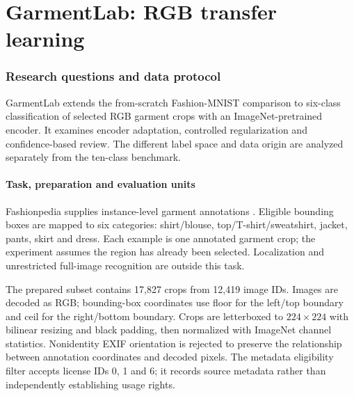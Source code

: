 \clearpage
\part{GarmentLab: RGB transfer learning}
\section{Research questions and data protocol}\label{sec:garmentlab}
GarmentLab extends the from-scratch Fashion-MNIST comparison to six-class classification of selected RGB garment crops with an ImageNet-pretrained encoder. It examines encoder adaptation, controlled regularization and confidence-based review. The different label space and data origin are analyzed separately from the ten-class benchmark.

\subsection{Task, preparation and evaluation units}
Fashionpedia supplies instance-level garment annotations \cite{fashionpedia}. Eligible bounding boxes are mapped to six categories: shirt/blouse, top/T-shirt/sweatshirt, jacket, pants, skirt and dress. Each example is one annotated garment crop; the experiment assumes the region has already been selected. Localization and unrestricted full-image recognition are outside this task.

The prepared subset contains 17,827 crops from 12,419 image IDs. Images are decoded as RGB; bounding-box coordinates use floor for the left/top boundary and ceil for the right/bottom boundary. Crops are letterboxed to $224\times224$ with bilinear resizing and black padding, then normalized with ImageNet channel statistics. Nonidentity EXIF orientation is rejected to preserve the relationship between annotation coordinates and decoded pixels. The metadata eligibility filter accepts license IDs 0, 1 and 6; it records source metadata rather than independently establishing usage rights.

